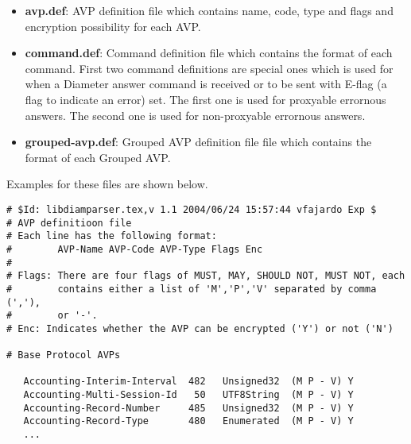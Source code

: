\begin{itemize}
 \item {\bf avp.def}: AVP definition file which contains name,
 code, type and flags and encryption possibility for each AVP.  
 \item {\bf command.def}: Command definition file which contains the
 format of each command.  First two command definitions are special ones
 which is used for when a Diameter answer command is received or to be
 sent with E-flag (a flag to indicate an error) set.  The first one is
 used for proxyable errornous answers.  The second one is used for
 non-proxyable errornous answers.  
 \item {\bf grouped-avp.def}: Grouped AVP definition file 
 file which contains the format of each Grouped AVP.  
\end{itemize}
Examples for these files are shown below.
\clearpage

\begin{verbatim}
# $Id: libdiamparser.tex,v 1.1 2004/06/24 15:57:44 vfajardo Exp $
# AVP definitioon file
# Each line has the following format:  
#        AVP-Name AVP-Code AVP-Type Flags Enc
# 
# Flags: There are four flags of MUST, MAY, SHOULD NOT, MUST NOT, each 
#        contains either a list of 'M','P','V' separated by comma (','), 
#        or '-'.
# Enc: Indicates whether the AVP can be encrypted ('Y') or not ('N')

# Base Protocol AVPs

   Accounting-Interim-Interval  482   Unsigned32  (M P - V) Y
   Accounting-Multi-Session-Id   50   UTF8String  (M P - V) Y
   Accounting-Record-Number     485   Unsigned32  (M P - V) Y
   Accounting-Record-Type       480   Enumerated  (M P - V) Y
   ...
\end{verbatim}
\clearpage

